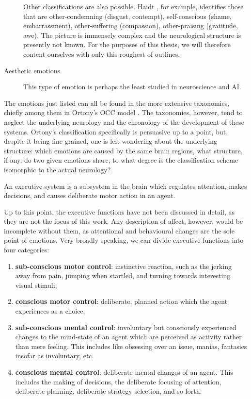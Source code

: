 \begin{description}
	Other classifications are also possible. Haidt \cite{haidt2003}, for example, identifies those that are other-condemning (disgust, contempt), self-conscious (shame, embarrassment), other-suffering (compassion), other-praising (gratitude, awe). The picture is immensely complex and the neurological structure is presently not known. For the purposes of this thesis, we will therefore content ourselves with only this roughest of outlines.
	
	\item[Aesthetic emotions.] This type of emotion is perhaps the least studied in neuroscience and AI.
	
\end{description}

The emotions just listed can all be found in the more extensive taxonomies, chiefly among them in Ortony's OCC model \cite{ortony1988}. The taxonomies, however, tend to neglect the underlying neurology and the chronology of the development of these systems. Ortony's classification specifically is persuasive up to a point, but, despite it being fine-grained, one is left wondering about the underlying structure: which emotions are caused by the same brain regions, what structure, if any, do two given emotions share, to what degree is the classification scheme isomorphic to the actual neurology?


\begin{definition}
An executive system is a subsystem in the brain which regulates attention, makes decisions, and causes deliberate motor action in an agent.
\end{definition}

Up to this point, the executive functions have not been discussed in detail, as they are not the focus of this work. Any description of affect, however, would be incomplete without them, as attentional and behavioural changes are the sole point of emotions. Very broadly speaking, we can divide executive functions into four categories:

\begin{enumerate}
	\item \textbf{sub-conscious motor control}: instinctive reaction, such as the jerking away from pain, jumping when startled, and turning towards interesting visual stimuli;
	\item \textbf{conscious motor control}: deliberate, planned action which the agent experiences as a choice;
	\item \textbf{sub-conscious mental control}: involuntary but consciously experienced changes to the mind-state of an agent which are perceived as activity rather than mere feeling. This includes like obsessing over an issue, manias, fantasies insofar as involuntary, etc.
	\item \textbf{conscious mental control}: deliberate mental changes of an agent. This includes the making of decisions, the deliberate focusing of attention, deliberate planning, deliberate strategy selection, and so forth.
\end{enumerate}

